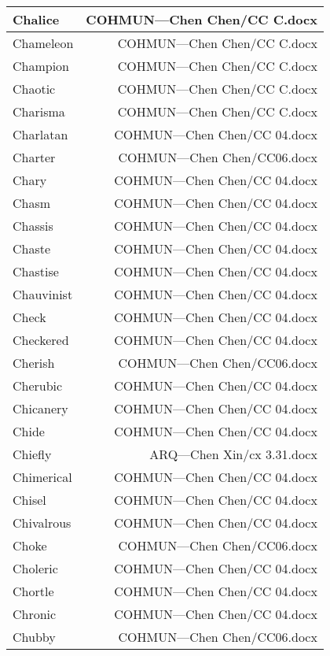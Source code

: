 \documentclass{article}
\begin{document}
\begin{center}
\begin{longtable}{|l|r|}
\hline
Chalice  &  COHMUN---Chen Chen/CC C.docx\\  
\hline
Chameleon  &  COHMUN---Chen Chen/CC C.docx\\  
\hline
Champion  &  COHMUN---Chen Chen/CC C.docx\\  
\hline
Chaotic  &  COHMUN---Chen Chen/CC C.docx\\  
\hline
Charisma  &  COHMUN---Chen Chen/CC C.docx\\  
\hline
Charlatan  &  COHMUN---Chen Chen/CC 04.docx\\  
\hline
Charter  &  COHMUN---Chen Chen/CC06.docx\\  
\hline
Chary  &  COHMUN---Chen Chen/CC 04.docx\\  
\hline
Chasm  &  COHMUN---Chen Chen/CC 04.docx\\  
\hline
Chassis  &  COHMUN---Chen Chen/CC 04.docx\\  
\hline
Chaste  &  COHMUN---Chen Chen/CC 04.docx\\  
\hline
Chastise  &  COHMUN---Chen Chen/CC 04.docx\\  
\hline
Chauvinist  &  COHMUN---Chen Chen/CC 04.docx\\  
\hline
Check  &  COHMUN---Chen Chen/CC 04.docx\\  
\hline
Checkered  &  COHMUN---Chen Chen/CC 04.docx\\  
\hline
Cherish  &  COHMUN---Chen Chen/CC06.docx\\  
\hline
Cherubic  &  COHMUN---Chen Chen/CC 04.docx\\  
\hline
Chicanery  &  COHMUN---Chen Chen/CC 04.docx\\  
\hline
Chide  &  COHMUN---Chen Chen/CC 04.docx\\  
\hline
Chiefly  &  ARQ---Chen Xin/cx 3.31.docx\\  
\hline
Chimerical  &  COHMUN---Chen Chen/CC 04.docx\\  
\hline
Chisel  &  COHMUN---Chen Chen/CC 04.docx\\  
\hline
Chivalrous  &  COHMUN---Chen Chen/CC 04.docx\\  
\hline
Choke  &  COHMUN---Chen Chen/CC06.docx\\  
\hline
Choleric  &  COHMUN---Chen Chen/CC 04.docx\\  
\hline
Chortle  &  COHMUN---Chen Chen/CC 04.docx\\  
\hline
Chronic  &  COHMUN---Chen Chen/CC 04.docx\\  
\hline
Chubby  &  COHMUN---Chen Chen/CC06.docx\\  

\end{longtable}
\end{center}
\end{document}
